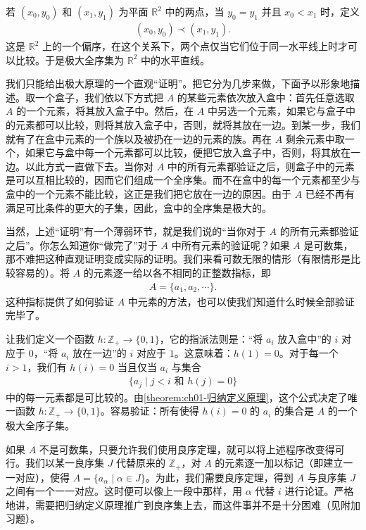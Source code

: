 \documentclass[../../main.tex]{subfiles}
\begin{document}
\begin{example}\label{example:ch01-水平直线}
若 $(x_{0}, y_{0})$ 和 $(x_{1}, y_{1})$ 为平面 $\mathbb{R}^{2}$ 中的两点，当 $y_{0} = y_{1}$ 并且 $x_{0} < x_{1}$ 时，定义
\begin{align*}
(x_{0}, y_{0}) \prec (x_{1}, y_{1}).
\end{align*}
这是 $\mathbb{R}^{2}$ 上的一个偏序，在这个关系下，两个点仅当它们位于同一水平线上时才可以比较。于是极大全序集为 $\mathbb{R}^{2}$ 中的水平直线。
\end{example}

我们只能给出极大原理的一个直观“证明”。把它分为几步来做，下面予以形象地描述。取一个盒子，我们依以下方式把 $A$ 的某些元素依次放入盒中：首先任意选取 $A$ 的一个元素，将其放入盒子中。然后，在 $A$ 中另选一个元素，如果它与盒子中的元素都可以比较，则将其放入盒子中，否则，就将其放在一边。到某一步，我们就有了在盒中元素的一个族以及被扔在一边的元素的族。再在 $A$ 剩余元素中取一个，如果它与盒中每一个元素都可以比较，便把它放入盒子中，否则，将其放在一边。以此方式一直做下去。当你对 $A$ 中的所有元素都验证之后，则盒子中的元素是可以互相比较的，因而它们组成一个全序集。而不在盒中的每一个元素都至少与盒中的一个元素不能比较，这正是我们把它放在一边的原因。由于 $A$ 已经不再有满足可比条件的更大的子集，因此，盒中的全序集是极大的。

当然，上述“证明”有一个薄弱环节，就是我们说的“当你对于 $A$ 的所有元素都验证之后”。你怎么知道你“做完了”对于 $A$ 中所有元素的验证呢？如果 $A$ 是可数集，那不难把这种直观证明变成实际的证明。我们来看可数无限的情形（有限情形是比较容易的）。将 $A$ 的元素逐一给以各不相同的正整数指标，即
\begin{align*}
A = \{a_{1}, a_{2}, \cdots\}.
\end{align*}
这种指标提供了如何验证 $A$ 中元素的方法，也可以使我们知道什么时候全部验证完毕了。

让我们定义一个函数 $h: \mathbb{Z}_{+} \longrightarrow \{0, 1\}$，它的指派法则是：“将 $a_{i}$ 放入盒中”的 $i$ 对应于 $0$，“将 $a_{i}$ 放在一边”的 $i$ 对应于 $1$。这意味着：$h(1) = 0$。对于每一个 $i > 1$，我们有 $h(i) = 0$ 当且仅当 $a_{i}$ 与集合
\begin{align*}
\{a_{j} \mid j < i \text{ 和 } h(j) = 0\}
\end{align*}
中的每一元素都是可比较的。由\cref{theorem:ch01-归纳定义原理}，这个公式决定了唯一函数 $h: \mathbb{Z}_{+} \longrightarrow \{0, 1\}$。容易验证：所有使得 $h(i) = 0$ 的 $a_{i}$ 的集合是 $A$ 的一个极大全序子集。

如果 $A$ 不是可数集，只要允许我们使用良序定理，就可以将上述程序改变得可行。我们以某一良序集 $J$ 代替原来的 $\mathbb{Z}_{+}$，对 $A$ 的元素逐一加以标记（即建立一一对应），使得 $A = \{a_{\alpha} \mid \alpha \in J\}$。为此，我们需要良序定理，得到 $A$ 与良序集 $J$ 之间有一个一一对应。这时便可以像上一段中那样，用 $\alpha$ 代替 $i$ 进行论证。严格地讲，需要把归纳定义原理推广到良序集上去，而这件事并不是十分困难（见附加习题）。
\end{document}
